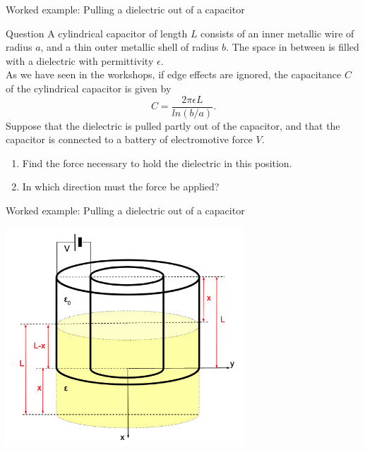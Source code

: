 {
\problemslide

\begin{frame}{Worked example: Pulling a dielectric out of a capacitor}

  \begin{blockexmplque}{Question}
  A cylindrical capacitor of length $L$ consists of an inner metallic wire
  of radius $a$, and a thin outer metallic shell of radius $b$.
  The space in between is filled with a dielectric with permittivity $\epsilon$.\\
  As we have seen in the workshops, if edge effects are ignored,
  the capacitance $C$ of the cylindrical
  capacitor is given by
  \begin{equation*}
    C = \frac{2\pi \epsilon L}{ln(b/a)}.
  \end{equation*}
  \vspace{0.2cm}
  Suppose that the dielectric is pulled partly out of the capacitor,
  and that the capacitor is connected to a battery of electromotive force $V$.
  \begin{enumerate}
  \item
  Find the force necessary to hold the dielectric in this position.
  \item
  In which direction must the force be applied?\\
  \end{enumerate}
  \end{blockexmplque}

\end{frame}

%
%
%

\begin{frame}{Worked example: Pulling a dielectric out of a capacitor}

  \begin{center}
    \includegraphics[width=0.67\textwidth]{./images/problems/lect4_pulling_dielectric_out_of_capacitor_1.png}\\
  \end{center}


\end{frame}}
